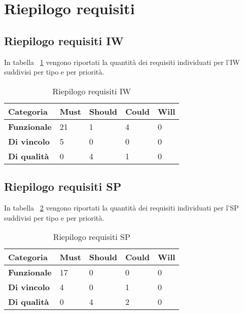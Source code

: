 \section{Riepilogo requisiti}

\subsection{Riepilogo requisiti IW}
In tabella ~\ref{tab:riepilogo-req-iw} vengono riportati la quantità dei requisiti individuati per l'IW suddivisi
per tipo e per priorità.
\begin{center}
    \begin{longtable}{|p{2cm}|p{2cm}|p{2cm}|p{2cm}|p{2cm}|}
    \caption{Riepilogo requisiti IW}
    \label{tab:riepilogo-req-iw}
    \endfirsthead
    \endhead
    \hline
    \textbf{Categoria}  & \textbf{Must} & \textbf{Should} & \textbf{Could} & \textbf{Will}\\
    \hline
    \textbf{Funzionale} & 21 & 1 & 4 & 0 \\
    \hline
    \textbf{Di vincolo} & 5 & 0 & 0 & 0 \\
    \hline
    \textbf{Di qualità} & 0 & 4 & 1 & 0 \\
    \hline
    \end{longtable}
    \end{center}%
\subsection{Riepilogo requisiti SP}
In tabella ~\ref{tab:riepilogo-req-sp} vengono riportati la quantità dei requisiti individuati per l'SP suddivisi
per tipo e per priorità.
\begin{center}
    \begin{longtable}{|p{2cm}|p{2cm}|p{2cm}|p{2cm}|p{2cm}|}
    \caption{Riepilogo requisiti SP}
    \label{tab:riepilogo-req-sp}
    \endfirsthead
    \endhead
    \hline
    \textbf{Categoria}  & \textbf{Must} & \textbf{Should} & \textbf{Could} & \textbf{Will}\\
    \hline
    \textbf{Funzionale} & 17 & 0 & 0 & 0 \\
    \hline
    \textbf{Di vincolo} & 4 & 0 & 1 & 0 \\
    \hline
    \textbf{Di qualità} & 0 & 4 & 2 & 0 \\
    \hline
    \end{longtable}
    \end{center}%